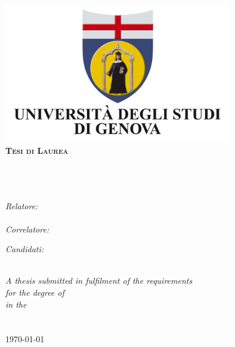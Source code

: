 \documentclass[12pt, twosides]{Thesis} %
\begin{document}
\begin{titlepage}
\begin{center}

\includegraphics[width=9.98cm,height=6.1cm]{Figures/UNIGE.jpg}\\[1cm]

\textsc{\Large \textbf{Tesi di Laurea}}\\[0.5cm] %

\HRule \\[0.4cm] %
{\huge \bfseries \ttitle}\\[0.4cm] %
\HRule \\[1.0cm] %
 
\begin{minipage}{0.45\textwidth}
\begin{flushleft} \large
\emph{Relatore:} \\
\href{http://goo.gl/JQlltW}{\supname} \\ %
\emph{Correlatore:} \\
{\crelator}
\end{flushleft}
\end{minipage}
\begin{minipage}{0.45\textwidth}
\begin{flushright} \large\emph{Candidati:}\\
{\nauthors} %
\end{flushright}
\end{minipage}\\[1.2cm]
 
\textit{A thesis submitted in fulfilment of the requirements\\ for the 
degree of \degreename}\\[.3cm] %
\textit{in the}\\[.4cm]
\groupname\\\deptname\\[.5cm] %
 
{\today}\\[4cm] %
 
\vfill
\end{center}

\end{titlepage}
\end{document}
